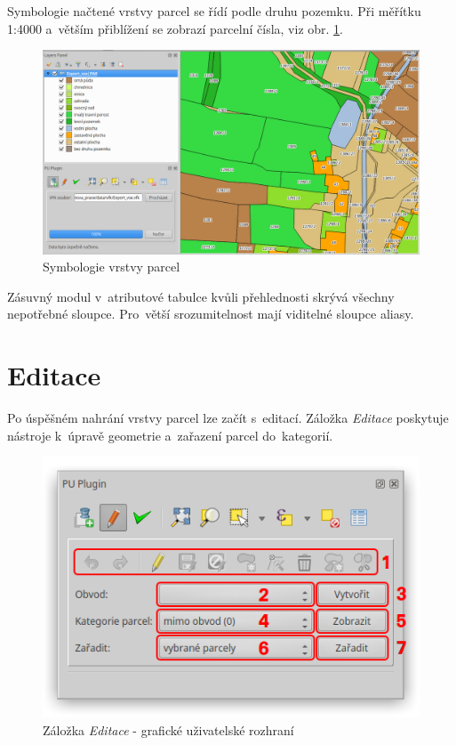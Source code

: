 Symbologie načtené vrstvy parcel se řídí podle druhu pozemku. Při měřítku 1:4000 a~větším přiblížení se zobrazí parcelní čísla, viz obr. \ref{fig:manual_symbologie_par}.

	\begin{figure}[H]
		\centering
		\includegraphics[width=.9\textwidth]{./pictures/symbologie_par.png}
		\caption[Symbologie vrstvy parcel]{Symbologie vrstvy parcel}
		\label{fig:manual_symbologie_par}
 	\end{figure}

Zásuvný modul v~atributové tabulce kvůli přehlednosti skrývá všechny nepotřebné sloupce. Pro~větší srozumitelnost mají viditelné sloupce aliasy.

\newpage

\section{Editace}
\label{manual_editace}

Po úspěšném nahrání vrstvy parcel lze začít s~editací. Záložka \textit{Editace} poskytuje nástroje k~úpravě geometrie a~zařazení parcel do~kategorií.

	\begin{figure}[H]
		\centering
		\includegraphics[width=.55\textwidth]{./pictures/editace_gui.png}
		\caption[Záložka \textit{Editace} - grafické uživatelské rozhraní]{Záložka \textit{Editace} - grafické uživatelské rozhraní}
		\label{fig:manual_editace_gui}
 	\end{figure}

